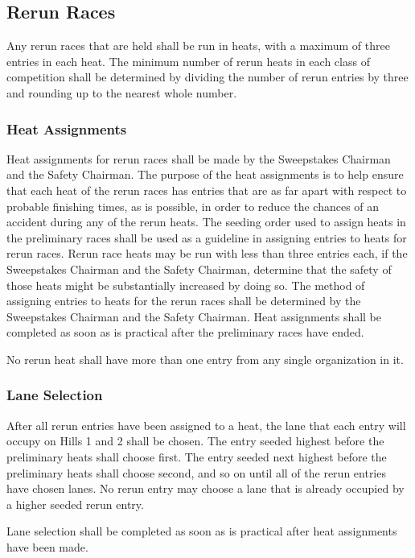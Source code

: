 \subsection{Rerun Races}
Any rerun races that are held shall be run in heats, with a maximum of three entries in each heat. The minimum number of rerun heats in each class of competition shall be determined by dividing the number of rerun entries by three and rounding up to the nearest whole number.

\subsubsection{Heat Assignments}

Heat assignments for rerun races shall be made by the Sweepstakes Chairman and the Safety Chairman. The purpose of the heat assignments is to help ensure that each heat of the rerun races has entries that are as far apart with respect to probable finishing times, as is possible, in order to reduce the chances of an accident during any of the rerun heats. The seeding order used to assign heats in the preliminary races shall be used as a guideline in assigning entries to heats for rerun races. Rerun race heats may be run with less than three entries each, if the Sweepstakes Chairman and the Safety Chairman, determine that the safety of those heats might be substantially increased by doing so. The method of assigning entries to heats for the rerun races shall be determined by the Sweepstakes Chairman and the Safety Chairman. Heat assignments shall be completed as soon as is practical after the preliminary races have ended.

No rerun heat shall have more than one entry from any single organization in it.

\subsubsection{Lane Selection}
After all rerun entries have been assigned to a heat, the lane that each entry will occupy on Hills 1 and 2 shall be chosen. The entry seeded highest before the preliminary heats shall choose first. The entry seeded next highest before the preliminary heats shall choose second, and so on until all of the rerun entries have chosen lanes. No rerun entry may choose a lane that is already occupied by a higher seeded rerun entry.

Lane selection shall be completed as soon as is practical after heat assignments have been made.

